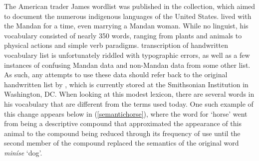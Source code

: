 The American trader James  wordlist was published in the \citet[446]{schoolcraft1853} collection, which aimed to document the numerous indigenous languages of the United States. \citeauthor{kipp1852} lived with the Mandan for a time, even marrying a Mandan woman. While no linguist, his vocabulary consisted of nearly 350 words, ranging from plants and animals to physical actions and simple verb paradigms.  transcription of  handwritten vocabulary list is unfortunately riddled with typographic errors, as well as a few instances of confusing Mandan data and non-Mandan data from some other list. As such, any attempts to use these data should refer back to the original handwritten list by \citeauthor{kipp1852}, which is currently stored at the Smithsonian Institution in Washington, DC. When looking at this modest lexicon, there are several words in his vocabulary that are different from the terms used today. One such example of this change appears below in (\ref{semantichorse}), where the word for `horse' went from being a descriptive compound that approximated the appearance of this animal to the compound being reduced through its frequency of use until the second member of the compound replaced the semantics of the original word \textit{miníse} `dog'.

